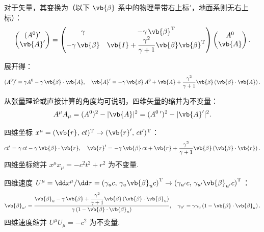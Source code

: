 对于矢量，其变换为（以下 \(\vb{\beta}\) 系中的物理量带右上标\('\)，地面系则无右上标）：
\begin{align*}
	\begin{pmatrix}
		(A^0)' \\
		\vb{A}'
	\end{pmatrix}
	=
	\begin{pmatrix}
		\gamma                & -\gamma \, \vb{\beta}^\mathrm{T}                                       \\
		-\gamma \, \vb{\beta} & \vb{I} + \dfrac{\gamma^2}{\gamma + 1} \vb{\beta} \vb{\beta}^\mathrm{T}
	\end{pmatrix}
	\begin{pmatrix}
		A^0 \\
		\vb{A}
	\end{pmatrix}.
\end{align*}

展开得：
\begin{align*}
	(A^0)' = \gamma A^0 - \gamma \, \vb{\beta} \cdot \vb{A}, \quad
	\vb{A}' = -\gamma \, \vb{\beta} \, A^0 + \vb{A} + \dfrac{\gamma^2}{\gamma + 1} \vb{\beta} \left( \vb{\beta} \cdot \vb{A} \right).
\end{align*}

从张量理论或直接计算的角度均可说明，四维矢量的缩并为不变量：
\begin{align*}
	A^\mu A_\mu = (A^0)^2 - |\vb{A}|^2 = (A^0\,')^2 - |\vb{A}'|^2.
\end{align*}

\begin{exbox}
	四维坐标 \(x^\mu = (\vb{r}, \, ct)^\mathrm{T} \to (\vb{r}', \, ct')^\mathrm{T}\)：
	\begin{align*}
		ct' = \gamma \, ct - \gamma \, \vb{\beta} \cdot \vb{r}, \quad
		\vb{r}' = -\gamma \, \vb{\beta} \, ct + \vb{r} + \dfrac{\gamma^2}{\gamma + 1} \vb{\beta} \left( \vb{\beta} \cdot \vb{r} \right).
	\end{align*}
	四维坐标缩并 \(x^\mu x_\mu = -c^2 t^2 + r^2\) 为不变量.
\end{exbox}

\begin{exbox}
	四维速度 \(U^\mu = \dd x^\mu/\dd \tau = \left( \gamma_u c, \, \gamma_u \vb{\beta}_u c \right)^\mathrm{T} \to \left( \gamma_{u'} c, \, \gamma_{u'} \vb{\beta}_{u'} c \right)^\mathrm{T}\)：
	\begin{align*}
		\vb{\beta}_{u'} = \dfrac{ \vb{\beta}_u - \gamma \, \vb{\beta} + \dfrac{\gamma^2}{\gamma + 1} \vb{\beta} \left( \vb{\beta} \cdot \vb{\beta}_u \right) }{ \gamma \left( 1 - \vb{\beta} \cdot \vb{\beta}_u \right) }, \quad
		\gamma_{u'} = \gamma \gamma_u \left( 1 - \vb{\beta} \cdot \vb{\beta}_u \right).
	\end{align*}
	四维速度缩并 \(U^\mu U_\mu = -c^2\) 为不变量.
\end{exbox}

